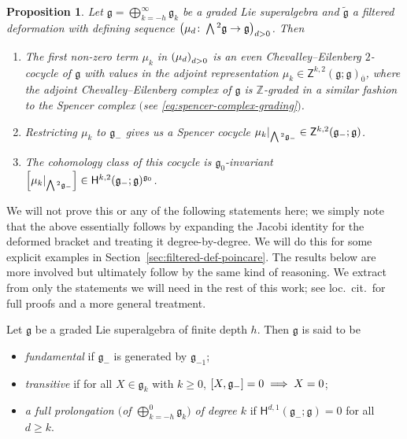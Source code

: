 \documentclass[11pt]{article}
\numberwithin{equation}{section}
\numberwithin{equation}{section}
\newtheorem{Proposition}[Theorem]{Proposition}
 { \theoremstyle{definition}
\newtheorem{Definition}[Theorem]{Definition}
\newtheorem{Note}[Theorem]{Note}
\newtheorem{Example}[Theorem]{Example}
\newtheorem{Remark}[Theorem]{Remark} }
\newcommand{\fg}{\mathfrak{g}}
\newcommand{\ZZ}{\mathbb{Z}}
\newcommand{\ssH}{\mathsf{H}}
\newcommand{\ssZ}{\mathsf{Z}}
\newcommand{\fgtilde}{\widetilde{\mathfrak{g}}}
\newcommand{\Wedge}{\mathchoice{{\textstyle\bigwedge}}{\bigwedge}{\bigwedge}{\bigwedge}}	%
\newcommand{\1}{\mathbbm{1}}
\begin{document}

\begin{Proposition}\label{prop:def-seq-spencer-cocycle}
	Let $\fg=\bigoplus_{k=-h}^\infty\fg_k$ be a graded Lie superalgebra and $\fgtilde$ a filtered deformation with defining sequence $\bigl(\mu_d\colon\Wedge^2\fg\to\fg\bigr)_{d> 0}$. Then
	\begin{enumerate}\itemsep=0pt
		\item[$(1)$] {\rm\cite[\emph{Proposition}~2.1]{Cheng1998}} The first non-zero term $\mu_k$ in $\qty(\mu_d)_{d> 0}$ is an even Chevalley--Eilenberg $2$-cocycle of $\fg$ with values in the adjoint representation
		$\mu_k\in\ssZ^{k,2}(\fg;\fg)_{\overline{0}}$,	
		where the adjoint Chevalley--Eilenberg complex of $\fg$ is $\ZZ$-graded in a similar fashion to the Spencer complex $($see \eqref{eq:spencer-complex-grading}$)$.
		\item[$(2)$] {\rm\cite[\emph{Proposition}~2.2]{Cheng1998}} Restricting $\mu_k$ to $\fg_-$ gives us a Spencer cocycle
		$\mu_k|_{\Wedge^2\fg_-}\in\ssZ^{k,2}(\fg_-;\fg)$.
		\item[$(3)$] {\rm\cite[\emph{Proposition}~2.2]{Cheng1998}} The cohomology class of this cocycle is $\fg_0$-invariant
			$\qty[\mu_k|_{\Wedge^2\fg_-}]\in \ssH^{k,2}(\fg_-;\fg)^{\fg_0}$.
	\end{enumerate}
\end{Proposition}
We will not prove this or any of the following statements here; we simply note that the above essentially follows by expanding the Jacobi identity for the deformed bracket and treating it degree-by-degree. We will do this for some explicit examples in Section~\ref{sec:filtered-def-poincare}. The results below are more involved but ultimately follow by the same kind of reasoning. We extract from \cite{Cheng1998} only the statements we will need in the rest of this work; see loc.\ cit.\ for full proofs and a more general treatment.

\begin{Definition}\label{def:fund-trans-prolong}
	Let $\fg$ be a graded Lie superalgebra of finite depth $h$. Then $\fg$ is said to be
	\begin{itemize}\itemsep=0pt
	\item \emph{fundamental} if $\fg_-$ is generated by $\fg_{-1}$;
	\item \emph{transitive} if for all $X\in\fg_k$ with $k\geq 0$, $\comm{X}{\fg_-}=0\implies X=0$;
	\item \emph{a full prolongation $\big($of $\bigoplus_{k=-h}^0\fg_k\big)$ of degree $k$} if $\ssH^{d,1}(\fg_-;\fg)=0$ for all $d\geq k$.
	\end{itemize}
\end{Definition}
\end{document}
